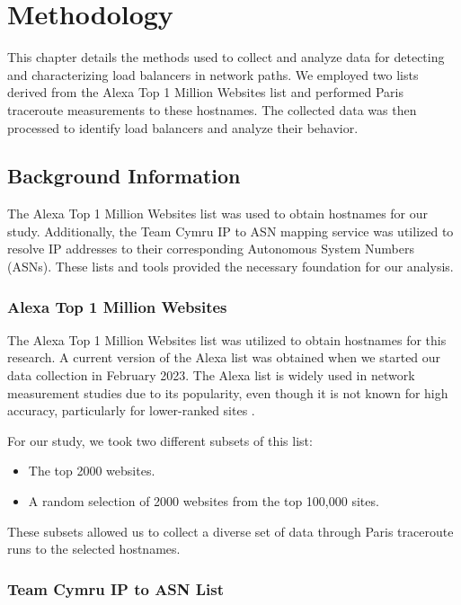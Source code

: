 \documentclass[12pt]{cwru_thesis}
\begin{document}
\chapter{Methodology}

This chapter details the methods used to collect and analyze data for detecting and characterizing load balancers in network paths. We employed two lists derived from the Alexa Top 1 Million Websites list and performed Paris traceroute measurements to these hostnames. The collected data was then processed to identify load balancers and analyze their behavior.

\section{Background Information}

The Alexa Top 1 Million Websites list was used to obtain hostnames for our study. Additionally, the Team Cymru IP to ASN mapping service was utilized to resolve IP addresses to their corresponding Autonomous System Numbers (ASNs). These lists and tools provided the necessary foundation for our analysis.

\subsection{Alexa Top 1 Million Websites}

The Alexa Top 1 Million Websites list was utilized to obtain hostnames for this research. A current version of the Alexa list was obtained when we started our data collection in February 2023. The Alexa list is widely used in network measurement studies due to its popularity, even though it is not known for high accuracy, particularly for lower-ranked sites \cite{Alexa}.

For our study, we took two different subsets of this list:
\begin{itemize}
    \item The top 2000 websites.
    \item A random selection of 2000 websites from the top 100,000 sites.
\end{itemize}
These subsets allowed us to collect a diverse set of data through Paris traceroute runs to the selected hostnames.

\subsection{Team Cymru IP to ASN List}
\end{document}
